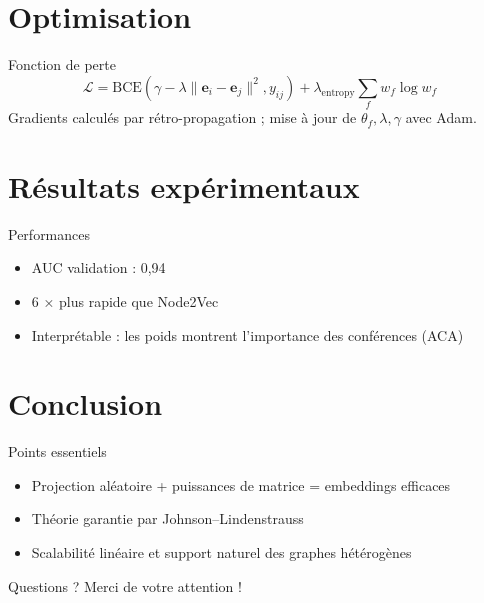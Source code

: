 \documentclass[9pt,aspectratio=169,professionalfonts]{beamer}
\begin{document}
\section{Optimisation}

\begin{frame}{Fonction de perte}
\[
\mathcal L = \mathrm{BCE}(\gamma-\lambda\|\mathbf e_i-\mathbf e_j\|^2, y_{ij}) + \lambda_{\mathrm{entropy}}\sum_f w_f\log w_f
\]
Gradients calculés par rétro-propagation ; mise à jour de $\theta_f,\lambda,\gamma$ avec Adam.
\end{frame}

\section{Résultats expérimentaux}

\begin{frame}{Performances}
\begin{itemize}
  \item AUC validation : 0,94
  \item 6 × plus rapide que Node2Vec
  \item Interprétable : les poids montrent l'importance des conférences (ACA)
\end{itemize}
\end{frame}

\section{Conclusion}

\begin{frame}{Points essentiels}
\begin{itemize}
  \item Projection aléatoire + puissances de matrice = embeddings efficaces
  \item Théorie garantie par Johnson–Lindenstrauss
  \item Scalabilité linéaire et support naturel des graphes hétérogènes
\end{itemize}
\end{frame}

\begin{frame}{Questions ?}
\centering
\Huge Merci de votre attention !
\end{frame}
\end{document}
